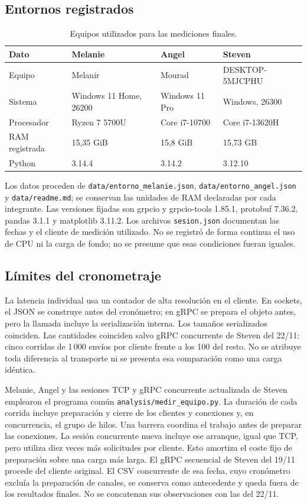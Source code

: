 \subsection{Entornos registrados}
\begin{table}[htbp]\centering\small
\caption{Equipos utilizados para las mediciones finales.}
\begin{tabularx}{\linewidth}{lXXX}
\toprule
Dato & Melanie & Angel & Steven \\
\midrule
Equipo & Melanir & Mourad & DESKTOP-5MJCPHU \\
Sistema & Windows 11 Home, 26200 & Windows 11 Pro & Windows, 26300 \\
Procesador & Ryzen 7 5700U & Core i7-10700 & Core i7-13620H \\
RAM registrada & 15,35 GiB & 15,8 GiB & 15,73 GB \\
Python & 3.14.4 & 3.14.2 & 3.12.10 \\
\bottomrule
\end{tabularx}\end{table}

Los datos proceden de \texttt{data/entorno\_melanie.json},
\texttt{data/entorno\_angel.json} y \texttt{data/readme.md}; se
conservan las unidades de RAM declaradas por cada integrante.
Las versiones fijadas son grpcio y grpcio-tools 1.85.1, protobuf
7.36.2, pandas 3.1.1 y matplotlib 3.11.2. Los archivos
\texttt{sesion.json} documentan las fechas y el cliente de medición
utilizado. No se registró de forma continua el uso de CPU ni la
carga de fondo; no se presume que esas condiciones fueran iguales.

\subsection{Límites del cronometraje}
La latencia individual usa un contador de alta resolución en el cliente.
En sockets, el JSON se construye antes del cronómetro; en gRPC se
prepara el objeto antes, pero la llamada incluye la serialización interna.
Los tamaños serializados coinciden. Las cantidades coinciden salvo
gRPC concurrente de Steven del 22/11: cinco corridas de 1\,000 envíos
por cliente frente a los 100 del resto. No se atribuye toda diferencia
al transporte ni se presenta esa comparación como una carga idéntica.

Melanie, Angel y las sesiones TCP y gRPC concurrente actualizada de
Steven emplearon el programa común
\texttt{analysis/medir\_equipo.py}. La duración de cada corrida incluye
preparación y cierre de los clientes y conexiones y, en concurrencia,
el grupo de hilos. Una barrera coordina el trabajo antes de preparar
las conexiones. La sesión concurrente nueva incluye ese arranque,
igual que TCP, pero utiliza diez veces más solicitudes por cliente.
Esto amortiza el coste fijo de preparación sobre una carga más larga.
El gRPC secuencial de Steven del 19/11 procede del cliente original.
El CSV concurrente de esa fecha, cuyo cronómetro excluía la preparación
de canales, se conserva como antecedente y queda fuera de los resultados
finales. No se concatenan sus observaciones con las del 22/11.

